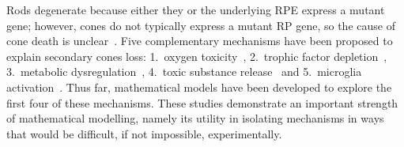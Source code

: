 \documentclass{article}
\begin{document}
Rods degenerate because either they or the underlying RPE express a mutant gene; however, cones do not typically express a mutant RP gene, so the cause of cone death is unclear~\cite{Daiger_et_al_2007,Ferrari_et_al_2011,Hamel_2006,Hamel_2007,Hartong_et_al_2006,Roosing_et_al_2014}. Five complementary mechanisms have been proposed to explain secondary cones loss: 1.\ oxygen toxicity~\cite{Stone_et_al_1999,Travis_et_al_1991,Valter_et_al_1998}, 2.\ trophic factor depletion~\cite{Chalmel_et_al_2007,Leveillard_et_al_2004,Ait-Ali_et_al_2015}, 3.\ metabolic dysregulation~\cite{Punzo_et_al_2009,Punzo_et_al_2012}, 4.\ toxic substance release~\cite{Ripps_2002} and 5.\ microglia activation~\cite{Gupta_et_al_2003}. Thus far, mathematical models have been developed to explore the first four of these mechanisms. These studies demonstrate an important strength of mathematical modelling, namely its utility in isolating mechanisms in ways that would be difficult, if not impossible, experimentally.
\end{document}
